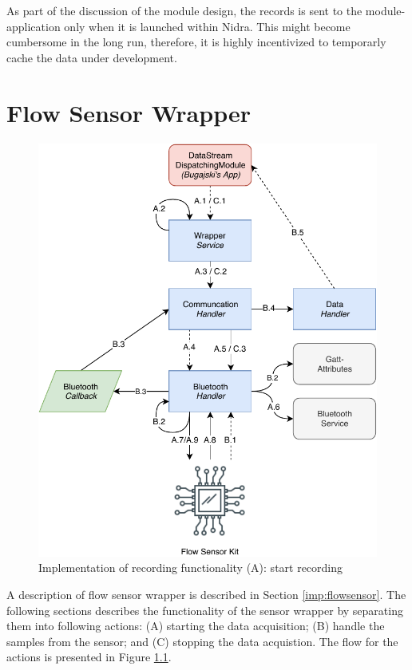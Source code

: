 As part of the discussion of the module design, the records is sent to the module-application only when it is launched within Nidra. This might become cumbersome in the long run, therefore, it is highly incentivized to temporarly cache the data under development. 


\chapter{Flow Sensor Wrapper}

\begin{figure}[!h]
    \centering
    \includegraphics[scale=0.7]{images/Flow_Imp.pdf}
    \caption{Implementation of recording functionality (A): start recording}
    \label{fig:impl_flowsensor}
\end{figure}

A description of flow sensor wrapper is described in Section \ref{imp:flowsensor}. The following sections describes the functionality of the sensor wrapper by separating them into following actions: (A) starting the data acquisition; (B) handle the samples from the sensor; and (C) stopping the data acquistion. The flow for the actions is presented in Figure \ref{fig:impl_flowsensor}.

